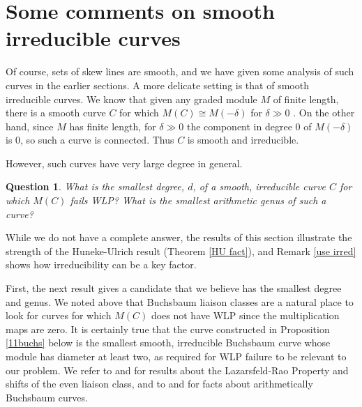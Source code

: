 \documentclass[12pt]{amsart}%
\numberwithin{equation}{section}
\newtheorem{question}[theorem]{Question}
\theoremstyle{definition}
\numberwithin{equation}{section}
\begin{document}

\section{Some comments on smooth irreducible curves}
\label{sec5}

Of course, sets of skew lines are smooth, and we have given some analysis of such curves in the earlier sections. A more delicate setting is that of smooth irreducible curves. We know that given any graded module $M$ of finite length, there is a smooth curve $C$ for which $M(C) \cong M(-\delta)$ for $\delta \gg 0$ \cite{rao}. {On the other hand, since $M$ has finite length, for $\delta \gg 0$ the component in degree 0 of $M(-\delta)$ is 0, so such a curve is connected. Thus $C$ is smooth and irreducible.}



However, such curves have very large degree in general.

\begin{question} \label{Q for curves}
What is the smallest degree, $d$, of a {\it smooth, irreducible} curve $C$ for which $M(C)$ fails WLP? What is the smallest arithmetic genus of such a curve?
\end{question}

While we do not have a complete answer, the results of this  section illustrate the strength of the Huneke-Ulrich result (Theorem \ref{HU fact}), and Remark \ref{use irred} shows how irreducibility can be a key factor.

First, the next result gives a candidate that we believe has the smallest degree and genus.  We noted above that Buchsbaum liaison classes are a natural place to look for curves for which $M(C)$ does not have WLP since the multiplication maps are zero. It is certainly true that the curve constructed in Proposition \ref{11buchs} below is the smallest smooth, irreducible Buchsbaum curve whose module has diameter at least two, as required for WLP failure to be relevant to our problem. We refer to \cite{BBM} and \cite{BM4}  for results about the Lazarsfeld-Rao Property and shifts of the even liaison class, and to \cite{BM2} and \cite{GM1} for facts about arithmetically Buchsbaum curves.
\end{document}
